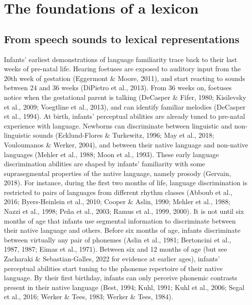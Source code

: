 \documentclass[
  12pt,
  b5paperpaper,
  twoside]{scrreprt}
\begin{document}
\hypertarget{the-foundations-of-a-lexicon}{%
\section{The foundations of a
lexicon}\label{the-foundations-of-a-lexicon}}

\hypertarget{from-speech-sounds-to-lexical-representations}{%
\subsection{From speech sounds to lexical
representations}\label{from-speech-sounds-to-lexical-representations}}

Infants' earliest demonstrations of language familiarity trace back to
their last weeks of pre-natal life. Hearing foetuses are exposed to
auditory input from the 20th week of gestation (Eggermont \& Moore,
2011), and start reacting to sounds between 24 and 36 weeks (DiPietro et
al., 2013). From 36 weeks on, foetuses notice when the gestational
parent is talking (DeCasper \& Fifer, 1980; Kisilevsky et al., 2009;
Voegtline et al., 2013), and can identify familiar melodies (DeCasper et
al., 1994). At birth, infants' perceptual abilities are already tuned to
pre-natal experience with language. Newborns can discriminate between
linguistic and non-linguistic sounds (Ecklund-Flores \& Turkewitz, 1996;
May et al., 2018; Vouloumanos \& Werker, 2004), and between their native
language and non-native languages (Mehler et al., 1988; Moon et al.,
1993). These early language discrimination abilities are shaped by
infants' familiarity with some suprasegmental properties of the native
language, namely prosody (Gervain, 2018). For instance, during the first
two months of life, language discrimination is restricted to pairs of
languages from different rhythm classes (Abboub et al., 2016;
Byers-Heinlein et al., 2010; Cooper \& Aslin, 1990; Mehler et al., 1988;
Nazzi et al., 1998; Peña et al., 2003; Ramus et al., 1999, 2000). It is
not until six months of age that infants use segmental information to
discriminate between their native language and others. Before six months
of age, infants discriminate between virtually any pair of phonemes
(Aslin et al., 1981; Bertoncini et al., 1987, 1987; Eimas et al., 1971).
Between six and 12 months of age (but see Zacharaki \& Sebastian-Galles,
2022 for evidence at earlier ages), infants' perceptual abilities start
tuning to the phoneme repertoire of their native language. By their
first birthday, infants can only perceive phonemic contrasts present in
their native language (Best, 1994; Kuhl, 1991; Kuhl et al., 2006; Segal
et al., 2016; Werker \& Tees, 1983; Werker \& Tees, 1984).
\end{document}
